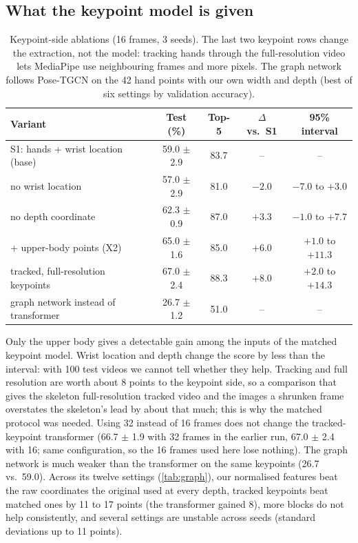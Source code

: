 \documentclass{article}
\begin{document}
\subsection{What the keypoint model is given}
\begin{table}[t]
\centering\small\setlength{\tabcolsep}{3pt}
\begin{tabular}{lcccc}
\toprule
Variant & Test (\%) & Top-5 & $\Delta$ vs.\ S1 & 95\% interval \\
\midrule
S1: hands + wrist location (base)        & 59.0 $\pm$ 2.9 & 83.7 & -- & -- \\
no wrist location                         & 57.0 $\pm$ 2.9 & 81.0 & $-2.0$ & $-7.0$ to $+3.0$ \\
no depth coordinate                       & 62.3 $\pm$ 0.9 & 87.0 & $+3.3$ & $-1.0$ to $+7.7$ \\
+ upper-body points (X2)                   & 65.0 $\pm$ 1.6 & 85.0 & $+6.0$ & $+1.0$ to $+11.3$ \\
tracked, full-resolution keypoints        & 67.0 $\pm$ 2.4 & 88.3 & $+8.0$ & $+2.0$ to $+14.3$ \\
graph network instead of transformer     & 26.7 $\pm$ 1.2 & 51.0 & -- & -- \\
\bottomrule
\end{tabular}
\caption{Keypoint-side ablations (16 frames, 3 seeds). The last two keypoint rows change the extraction, not the model:
tracking hands through the full-resolution video lets MediaPipe use neighbouring frames and more pixels. The graph
network follows Pose-TGCN \citep{li2020wlasl} on the 42 hand points with our own width and depth (best of six settings
by validation accuracy).}
\label{tab:kp-abl}
\end{table}

Only the upper body gives a detectable gain among the inputs of the matched keypoint model. Wrist location and depth
change the score by less than the interval: with 100 test videos we cannot tell whether they help. Tracking and full
resolution are worth about 8 points to the keypoint side, so a comparison that gives the skeleton full-resolution
tracked video and the images a shrunken frame overstates the skeleton's lead by about that much; this is why the
matched protocol was needed. Using 32 instead of 16 frames does not change the tracked-keypoint transformer (66.7 $\pm$ 1.9 with 32 frames in the
earlier run, 67.0 $\pm$ 2.4 with 16; same configuration, so the 16 frames used here lose nothing). The graph network is much
weaker than the transformer on the same keypoints (26.7 vs.\ 59.0). Across its twelve settings (\cref{tab:graph}), our
normalised features beat the raw coordinates the original used at every depth, tracked keypoints beat matched ones by
11 to 17 points (the transformer gained 8), more blocks do not help consistently, and several settings are unstable
across seeds (standard deviations up to 11 points).
\end{document}
